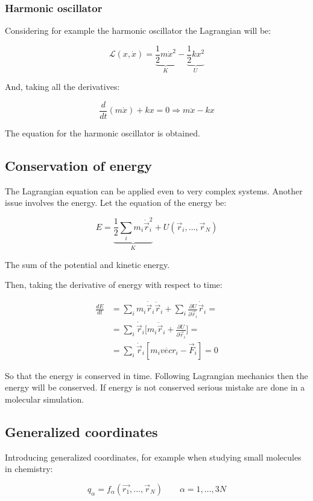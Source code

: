 		\subsubsection{Harmonic oscillator}
		Considering for example the harmonic oscillator the Lagrangian will be:

		$$\mathcal{L}(x, \dot{x}) = \underbrace{\frac{1}{2}m\dot{x}^2}_{K}-\underbrace{\frac{1}{2}kx^2}_{U}$$

		And, taking all the derivatives:

		$$\frac{d}{dt}(m\dot{x}) + kx = 0\Rightarrow m\ddot{x} - kx$$

		The equation for the harmonic oscillator is obtained.

	\subsection{Conservation of energy}
	The Lagrangian equation can be applied even to very complex systems.
	Another issue involves the energy.
	Let the equation of the energy be:

	$$E = \underbrace{\frac{1}{2}\sum\limits_{i}m_i\dot{\vec{r}}_i^2}_{K} + U(\vec{r}_i, \dots, \vec{r}_N)$$

	The sum of the potential and kinetic energy.

	Then, taking the derivative of energy with respect to time:

	\begin{align*}
		\frac{dE}{dt}&= \sum\limits_im_i\dot{\vec{r}}_i\ddot{\vec{r}}_i + \sum\limits_i\frac{\partial U}{\partial \vec{r}_i}\dot{\vec{r}}_i=\\
								 &=\sum\limits_i\dot{\vec{r}}_i\biggl[m_i\ddot{\vec{r}}_i+\frac{\partial U}{\partial\vec{r}_i}\biggr] = \\
								 &=\sum\limits_i\dot{\vec{r}}_i[m_i\ddot{vec{r}}_i-\vec{F}_i] = 0
	\end{align*}

	So that the energy is conserved in time.
	Following Lagrangian mechanics then the energy will be conserved.
	If energy is not conserved serious mistake are done in a molecular simulation.

	\subsection{Generalized coordinates}
	Introducing generalized coordinates, for example when studying small molecules in chemistry:

	$$q_\alpha = f_\alpha(\vec{r_1}, \dots, \vec{r}_N)\qquad \alpha = 1, \dots, 3N$$


